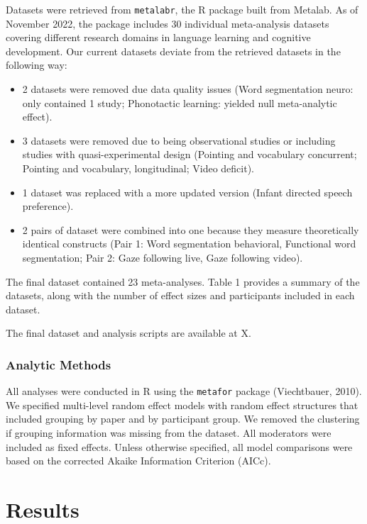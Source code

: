 \documentclass[10pt, letterpaper]{article}
\begin{document}
Datasets were retrieved from \texttt{metalabr}, the R package built from
Metalab. As of November 2022, the package includes 30 individual
meta-analysis datasets covering different research domains in language
learning and cognitive development. Our current datasets deviate from
the retrieved datasets in the following way:

\begin{itemize}
\item 2 datasets were removed due data quality issues (Word segmentation neuro: only contained 1 study; Phonotactic learning: yielded null meta-analytic effect).
\item 3 datasets were removed due to being observational studies or including studies with quasi-experimental design (Pointing and vocabulary concurrent; Pointing and vocabulary, longitudinal; Video deficit).
\item 1 dataset was replaced with a more updated version (Infant directed speech preference).
\item 2 pairs of dataset were combined into one because they measure theoretically identical constructs (Pair 1: Word segmentation behavioral, Functional word segmentation; Pair 2: Gaze following live, Gaze following video). 
\end{itemize}

The final dataset contained 23 meta-analyses. Table 1 provides a summary
of the datasets, along with the number of effect sizes and participants
included in each dataset.

The final dataset and analysis scripts are available at X.

\hypertarget{analytic-methods}{%
\subsubsection{Analytic Methods}\label{analytic-methods}}

All analyses were conducted in R using the \texttt{metafor} package
(Viechtbauer, 2010). We specified multi-level random effect models with
random effect structures that included grouping by paper and by
participant group. We removed the clustering if grouping information was
missing from the dataset. All moderators were included as fixed effects.
Unless otherwise specified, all model comparisons were based on the
corrected Akaike Information Criterion (AICc).

\hypertarget{results}{%
\section{Results}\label{results}}
\end{document}
